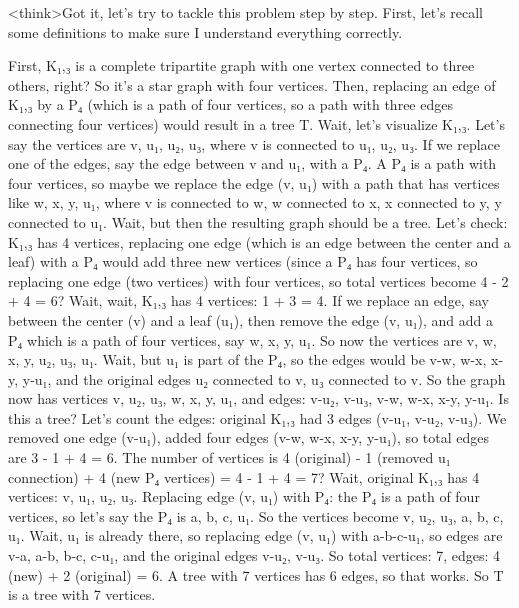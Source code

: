 <think>Got it, let's try to tackle this problem step by step. First, let's recall some definitions to make sure I understand everything correctly. 

First, K₁,₃ is a complete tripartite graph with one vertex connected to three others, right? So it's a star graph with four vertices. Then, replacing an edge of K₁,₃ by a P₄ (which is a path of four vertices, so a path with three edges connecting four vertices) would result in a tree T. Wait, let's visualize K₁,₃. Let's say the vertices are v, u₁, u₂, u₃, where v is connected to u₁, u₂, u₃. If we replace one of the edges, say the edge between v and u₁, with a P₄. A P₄ is a path with four vertices, so maybe we replace the edge (v, u₁) with a path that has vertices like w, x, y, u₁, where v is connected to w, w connected to x, x connected to y, y connected to u₁. Wait, but then the resulting graph should be a tree. Let's check: K₁,₃ has 4 vertices, replacing one edge (which is an edge between the center and a leaf) with a P₄ would add three new vertices (since a P₄ has four vertices, so replacing one edge (two vertices) with four vertices, so total vertices become 4 - 2 + 4 = 6? Wait, wait, K₁,₃ has 4 vertices: 1 + 3 = 4. If we replace an edge, say between the center (v) and a leaf (u₁), then remove the edge (v, u₁), and add a P₄ which is a path of four vertices, say w, x, y, u₁. So now the vertices are v, w, x, y, u₂, u₃, u₁. Wait, but u₁ is part of the P₄, so the edges would be v-w, w-x, x-y, y-u₁, and the original edges u₂ connected to v, u₃ connected to v. So the graph now has vertices v, u₂, u₃, w, x, y, u₁, and edges: v-u₂, v-u₃, v-w, w-x, x-y, y-u₁. Is this a tree? Let's count the edges: original K₁,₃ had 3 edges (v-u₁, v-u₂, v-u₃). We removed one edge (v-u₁), added four edges (v-w, w-x, x-y, y-u₁), so total edges are 3 - 1 + 4 = 6. The number of vertices is 4 (original) - 1 (removed u₁ connection) + 4 (new P₄ vertices) = 4 - 1 + 4 = 7? Wait, original K₁,₃ has 4 vertices: v, u₁, u₂, u₃. Replacing edge (v, u₁) with P₄: the P₄ is a path of four vertices, so let's say the P₄ is a, b, c, u₁. So the vertices become v, u₂, u₃, a, b, c, u₁. Wait, u₁ is already there, so replacing edge (v, u₁) with a-b-c-u₁, so edges are v-a, a-b, b-c, c-u₁, and the original edges v-u₂, v-u₃. So total vertices: 7, edges: 4 (new) + 2 (original) = 6. A tree with 7 vertices has 6 edges, so that works. So T is a tree with 7 vertices.

